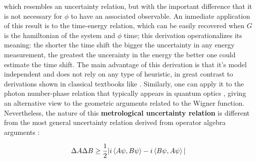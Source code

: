 which resembles an uncertainty relation, but with the
important difference that it is not necessary for $\phi$ to have
an associated observable. An inmediate application of this
result is to the time-energy relation, which can be easily
recovered when $G$ is the hamiltonian of the system
and $\phi$ time; this derivation operationalizes its meaning:
the shorter the time shift the bigger the uncertainty in any
energy measurement, the greatest the uncerainty in the energy the better one could estimate the time shift. The main advantage of this
derivation is that it's model independent and does not rely on any type of heuristic, in great contrast to derivations shown in classical
textbooks like \cite{cohen1986quantum,sakurai2020modern}. Similarly, one can apply it to the photon number-phase relation that typically
appears in quantum optics \cite{loudon_quantum_2010}, giving an alternative view to the geometric arguments related to the Wigner function.
Nevertheless, the nature of this \textbf{metrological uncertainty relation} is different from the most general uncertainty relation
derived from operator algebra arguments \cite{gieres2000mathematical}:

\begin{equation}
\Delta A \Delta B \geq \frac{1}{2}|i\braket{A\psi, B\psi} - i\braket{B\psi,A\psi}|
\end{equation}

